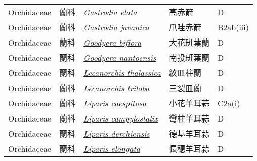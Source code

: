{\begin{longtable}{p{2.5cm}p{2.5cm}p{4.5cm}p{2.5cm}p{3cm}}
    Orchidaceae & 蘭科 & \href{http://www.theplantlist.org/tpl1.1/search?q=Gastrodia+elata}{\textit{Gastrodia elata} } & 高赤箭 & D \index{Gastrodia@\textit{Gastrodia}!elata@\textit{elata}}  \index{高赤箭} \\
    Orchidaceae & 蘭科 & \href{http://www.theplantlist.org/tpl1.1/search?q=Gastrodia+javanica}{\textit{Gastrodia javanica} } & 爪哇赤箭 & B2ab(iii) \index{Gastrodia@\textit{Gastrodia}!javanica@\textit{javanica}}  \index{爪哇赤箭} \\
    Orchidaceae & 蘭科 & \href{http://www.theplantlist.org/tpl1.1/search?q=Goodyera+biflora}{\textit{Goodyera biflora} } & 大花斑葉蘭 & D \index{Goodyera@\textit{Goodyera}!biflora@\textit{biflora}}  \index{大花斑葉蘭} \\
    Orchidaceae & 蘭科 & \href{http://www.theplantlist.org/tpl1.1/search?q=Goodyera+nantoensis}{\textit{Goodyera nantoensis} } & 南投斑葉蘭 & D \index{Goodyera@\textit{Goodyera}!nantoensis@\textit{nantoensis}}  \index{南投斑葉蘭} \\
    Orchidaceae & 蘭科 & \href{http://www.theplantlist.org/tpl1.1/search?q=Lecanorchis+thalassica}{\textit{Lecanorchis thalassica} } & 紋皿柱蘭 & D \index{Lecanorchis@\textit{Lecanorchis}!thalassica@\textit{thalassica}}  \index{紋皿柱蘭} \\
    Orchidaceae & 蘭科 & \href{http://www.theplantlist.org/tpl1.1/search?q=Lecanorchis+triloba}{\textit{Lecanorchis triloba} } & 三裂皿蘭 & D \index{Lecanorchis@\textit{Lecanorchis}!triloba@\textit{triloba}}  \index{三裂皿蘭} \\
    Orchidaceae & 蘭科 & \href{http://www.theplantlist.org/tpl1.1/search?q=Liparis+caespitosa}{\textit{Liparis caespitosa} } & 小花羊耳蒜 & C2a(i) \index{Liparis@\textit{Liparis}!caespitosa@\textit{caespitosa}}  \index{小花羊耳蒜} \\
    Orchidaceae & 蘭科 & \href{http://www.theplantlist.org/tpl1.1/search?q=Liparis+campylostalix}{\textit{Liparis campylostalix} } & 彎柱羊耳蒜 & D \index{Liparis@\textit{Liparis}!campylostalix@\textit{campylostalix}}  \index{彎柱羊耳蒜} \\
    Orchidaceae & 蘭科 & \href{http://www.theplantlist.org/tpl1.1/search?q=Liparis+derchiensis}{\textit{Liparis derchiensis} } & 德基羊耳蒜 & D \index{Liparis@\textit{Liparis}!derchiensis@\textit{derchiensis}}  \index{德基羊耳蒜} \\
    Orchidaceae & 蘭科 & \href{http://www.theplantlist.org/tpl1.1/search?q=Liparis+elongata}{\textit{Liparis elongata} } & 長穗羊耳蒜 & D \index{Liparis@\textit{Liparis}!elongata@\textit{elongata}}  \index{長穗羊耳蒜} \\

\end{longtable}}
